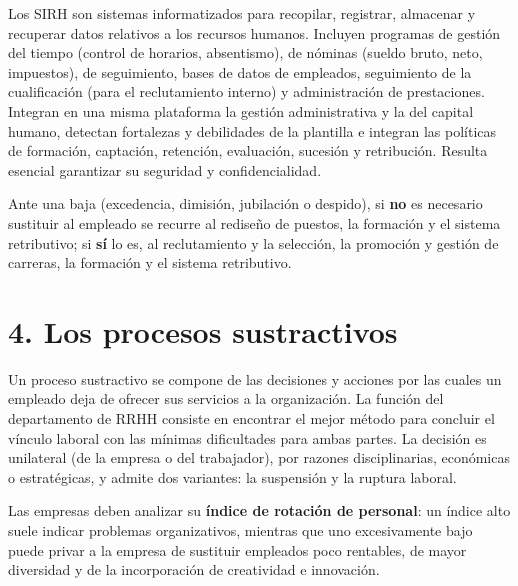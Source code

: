 \documentclass[12pt]{book} %
\begin{document}
Los SIRH son sistemas informatizados para recopilar, registrar,
almacenar y recuperar datos relativos a los recursos humanos. Incluyen
programas de gestión del tiempo (control de horarios, absentismo), de
nóminas (sueldo bruto, neto, impuestos), de seguimiento, bases de datos
de empleados, seguimiento de la cualificación (para el reclutamiento
interno) y administración de prestaciones. Integran en una misma
plataforma la gestión administrativa y la del capital humano, detectan
fortalezas y debilidades de la plantilla e integran las políticas de
formación, captación, retención, evaluación, sucesión y retribución.
Resulta esencial garantizar su seguridad y confidencialidad.

Ante una baja (excedencia, dimisión, jubilación o despido), si
\textbf{no} es necesario sustituir al empleado se recurre al rediseño de
puestos, la formación y el sistema retributivo; si \textbf{sí} lo es, al
reclutamiento y la selección, la promoción y gestión de carreras, la
formación y el sistema retributivo.

\hypertarget{los-procesos-sustractivos}{%
\section{4. Los procesos sustractivos}\label{los-procesos-sustractivos}}

Un proceso sustractivo se compone de las decisiones y acciones por las
cuales un empleado deja de ofrecer sus servicios a la organización. La
función del departamento de RRHH consiste en encontrar el mejor método
para concluir el vínculo laboral con las mínimas dificultades para ambas
partes. La decisión es unilateral (de la empresa o del trabajador), por
razones disciplinarias, económicas o estratégicas, y admite dos
variantes: la suspensión y la ruptura laboral.

Las empresas deben analizar su \textbf{índice de rotación de personal}:
un índice alto suele indicar problemas organizativos, mientras que uno
excesivamente bajo puede privar a la empresa de sustituir empleados poco
rentables, de mayor diversidad y de la incorporación de creatividad e
innovación.
\end{document}
